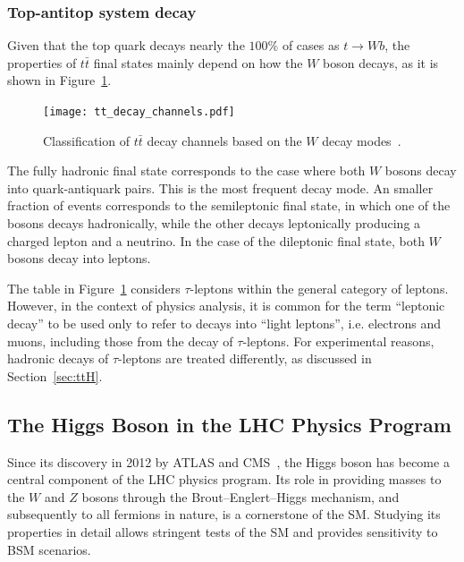 \subsubsection*{Top-antitop system decay}
\label{subsec:top_quark_decay}

Given that the top quark decays nearly the $100\%$ of cases as $t\rightarrow Wb$, the properties of $t\bar{t}$ final states mainly depend on how the $W$ boson decays, as it is shown in Figure~\ref{fig:diagram-top}.
\begin{figure}[htbp]
    \centering
    \texttt{[image: tt\_decay\_channels.pdf]}
    \caption{Classification of $t\bar{t}$ decay channels based on the $W$ decay modes~\cite{Lannon_2012}.}
    \label{fig:diagram-top}
\end{figure}

The fully hadronic final state corresponds to the case where both $W$ bosons decay into quark-antiquark pairs. This is the most frequent decay mode. An smaller fraction of events corresponds to the semileptonic final state, in which one of the bosons decays hadronically, while the other decays leptonically producing a charged lepton and a neutrino. In the case of the dileptonic final state, both $W$ bosons decay into leptons.

The table in Figure~\ref{fig:diagram-top} considers $\tau$-leptons within the general category of leptons. However, in the context of physics analysis, it is common for the term ``leptonic decay'' to be used only to refer to decays into ``light leptons'', i.e. electrons and muons, including those from the decay of $\tau$-leptons. For experimental reasons, hadronic decays of $\tau$-leptons are treated differently, as discussed in Section~\ref{sec:ttH}.

\subsection{The Higgs Boson in the LHC Physics Program}
\label{sec:higgs_program}

Since its discovery in 2012 by ATLAS and CMS~\cite{ATLAS:2012yve,CMS:2012qbp}, the Higgs boson has become a central component of the LHC physics program. Its role in providing masses to the $W$ and $Z$ bosons through the Brout–Englert–Higgs mechanism, and subsequently to all fermions in nature, is a cornerstone of the SM. Studying its properties in detail allows stringent tests of the SM and provides sensitivity to BSM scenarios.

